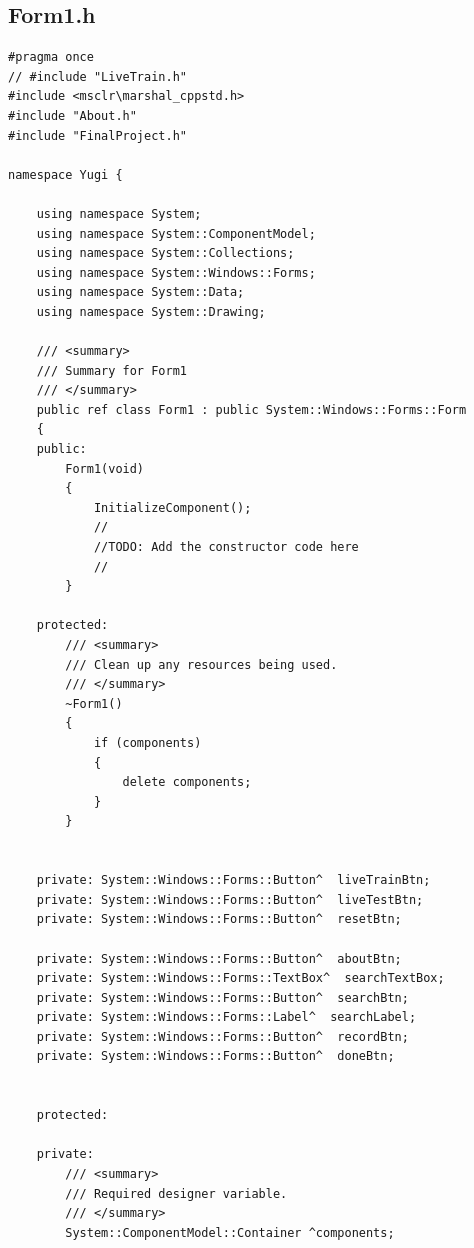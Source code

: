 \documentclass{article}
\begin{document}
\subsection{Form1.h}
\begin{lstlisting}
#pragma once
// #include "LiveTrain.h"
#include <msclr\marshal_cppstd.h>
#include "About.h"
#include "FinalProject.h"

namespace Yugi {

	using namespace System;
	using namespace System::ComponentModel;
	using namespace System::Collections;
	using namespace System::Windows::Forms;
	using namespace System::Data;
	using namespace System::Drawing;

	/// <summary>
	/// Summary for Form1
	/// </summary>
	public ref class Form1 : public System::Windows::Forms::Form
	{
	public:
		Form1(void)
		{
			InitializeComponent();
			//
			//TODO: Add the constructor code here
			//
		}

	protected:
		/// <summary>
		/// Clean up any resources being used.
		/// </summary>
		~Form1()
		{
			if (components)
			{
				delete components;
			}
		}


	private: System::Windows::Forms::Button^  liveTrainBtn;
	private: System::Windows::Forms::Button^  liveTestBtn;
	private: System::Windows::Forms::Button^  resetBtn;

	private: System::Windows::Forms::Button^  aboutBtn;
	private: System::Windows::Forms::TextBox^  searchTextBox;
	private: System::Windows::Forms::Button^  searchBtn;
	private: System::Windows::Forms::Label^  searchLabel;
	private: System::Windows::Forms::Button^  recordBtn;
	private: System::Windows::Forms::Button^  doneBtn;


	protected: 

	private:
		/// <summary>
		/// Required designer variable.
		/// </summary>
		System::ComponentModel::Container ^components;


\end{lstlisting}
\end{document}
